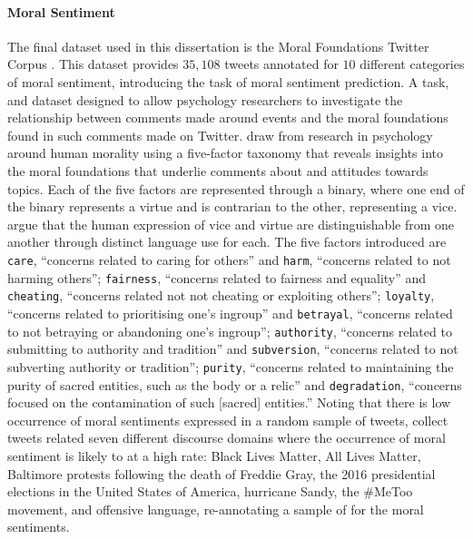 \paragraph*{Moral Sentiment} The final dataset used in this dissertation is the Moral Foundations Twitter Corpus \citep{Hoover:2019}. This dataset provides $35,108$ tweets annotated for $10$ different categories of moral sentiment, introducing the task of moral sentiment prediction.
A task, and dataset designed to allow psychology researchers to investigate the relationship between comments made around events and the moral foundations found in such comments made on Twitter.
\citet{Hoover:2019} draw from research in psychology around human morality using a five-factor taxonomy that reveals insights into the moral foundations \citep{Graham:2009,Graham:2013} that underlie comments about and attitudes towards topics.
Each of the five factors are represented through a binary, where one end of the binary represents a virtue and is contrarian to the other, representing a vice.
\citet{Hoover:2019} argue that the human expression of vice and virtue are distinguishable from one another through distinct language use for each.
The five factors introduced are \texttt{care}, ``concerns related to caring for others'' and \texttt{harm}, ``concerns related to not harming others''; \texttt{fairness}, ``concerns related to fairness and equality'' and \texttt{cheating}, ``concerns related not not cheating or exploiting others''; \texttt{loyalty}, ``concerns related to prioritising one's ingroup'' and \texttt{betrayal}, ``concerns related to not betraying or abandoning one's ingroup''; \texttt{authority}, ``concerns related to submitting to authority and tradition'' and \texttt{subversion}, ``concerns related to not subverting authority or tradition''; \texttt{purity}, ``concerns related to maintaining the purity of sacred entities, such as the body or a relic'' and \texttt{degradation}, ``concerns focused on the contamination of such [sacred] entities.''
Noting that there is low occurrence of moral sentiments expressed in a random sample of tweets, \citet{Hoover:2019} collect tweets related seven different discourse domains where the occurrence of moral sentiment is likely to at a high rate: Black Lives Matter, All Lives Matter, Baltimore protests following the death of Freddie Gray, the 2016 presidential elections in the United States of America, hurricane Sandy, the \#MeToo movement, and offensive language, re-annotating a sample of \citet{Davidson:2017} for the moral sentiments.
